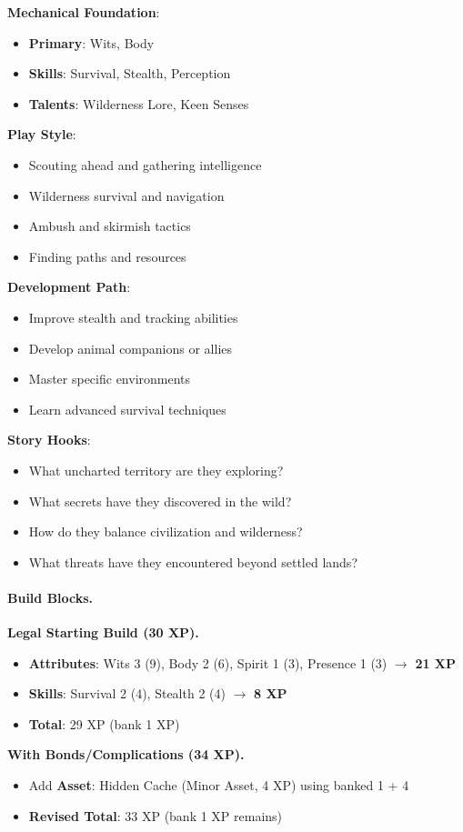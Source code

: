 \begin{multicols}{2}
\textbf{Mechanical Foundation}:
\begin{itemize}
\item \textbf{Primary}: Wits, Body
\item \textbf{Skills}: Survival, Stealth, Perception
\item \textbf{Talents}: Wilderness Lore, Keen Senses
\end{itemize}

\textbf{Play Style}:
\begin{itemize}
\item Scouting ahead and gathering intelligence
\item Wilderness survival and navigation
\item Ambush and skirmish tactics
\item Finding paths and resources
\end{itemize}

\textbf{Development Path}:
\begin{itemize}
\item Improve stealth and tracking abilities
\item Develop animal companions or allies
\item Master specific environments
\item Learn advanced survival techniques
\end{itemize}

\textbf{Story Hooks}:
\begin{itemize}
\item What uncharted territory are they exploring?
\item What secrets have they discovered in the wild?
\item How do they balance civilization and wilderness?
\item What threats have they encountered beyond settled lands?
\end{itemize}

\paragraph{Build Blocks.}
\textbf{Legal Starting Build (30 XP).}
\begin{itemize}
\item \textbf{Attributes}: Wits 3 (9), Body 2 (6), Spirit 1 (3), Presence 1 (3) $\rightarrow$ \textbf{21 XP}
\item \textbf{Skills}: Survival 2 (4), Stealth 2 (4) $\rightarrow$ \textbf{8 XP}
\item \textbf{Total}: 29 XP (bank 1 XP)
\end{itemize}
\textbf{With Bonds/Complications (34 XP).}
\begin{itemize}
\item Add \textbf{Asset}: Hidden Cache (Minor Asset, 4 XP) using banked 1 + 4
\item \textbf{Revised Total}: 33 XP (bank 1 XP remains)
\end{itemize}


\end{multicols}
